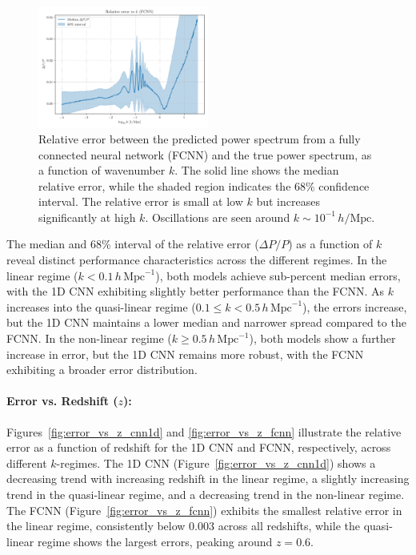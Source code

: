 \documentclass[twocolumn]{aastex631}
\begin{document}
\begin{figure}[h]
    \centering
    \includegraphics[width=0.5\textwidth]{plots/error_vs_k_fcnn_4_1745408320.png}
    \caption{\label{fig:error_vs_k_fcnn}Relative error between the predicted power spectrum from a fully connected neural network (FCNN) and the true power spectrum, as a function of wavenumber $k$. The solid line shows the median relative error, while the shaded region indicates the 68\% confidence interval. The relative error is small at low $k$ but increases significantly at high $k$. Oscillations are seen around $k \sim 10^{-1} \, h/\mathrm{Mpc}$.}
\end{figure}

The median and 68\% interval of the relative error ($\Delta P/P$) as a function of $k$ reveal distinct performance characteristics across the different regimes. In the linear regime ($k < 0.1\,h\,\mathrm{Mpc}^{-1}$), both models achieve sub-percent median errors, with the 1D CNN exhibiting slightly better performance than the FCNN. As $k$ increases into the quasi-linear regime ($0.1 \leq k < 0.5\,h\,\mathrm{Mpc}^{-1}$), the errors increase, but the 1D CNN maintains a lower median and narrower spread compared to the FCNN. In the non-linear regime ($k \geq 0.5\,h\,\mathrm{Mpc}^{-1}$), both models show a further increase in error, but the 1D CNN remains more robust, with the FCNN exhibiting a broader error distribution.

\paragraph{Error vs. Redshift ($z$):}

Figures~\ref{fig:error_vs_z_cnn1d} and \ref{fig:error_vs_z_fcnn} illustrate the relative error as a function of redshift for the 1D CNN and FCNN, respectively, across different $k$-regimes. The 1D CNN (Figure~\ref{fig:error_vs_z_cnn1d}) shows a decreasing trend with increasing redshift in the linear regime, a slightly increasing trend in the quasi-linear regime, and a decreasing trend in the non-linear regime. The FCNN (Figure~\ref{fig:error_vs_z_fcnn}) exhibits the smallest relative error in the linear regime, consistently below 0.003 across all redshifts, while the quasi-linear regime shows the largest errors, peaking around $z=0.6$.
\end{document}
